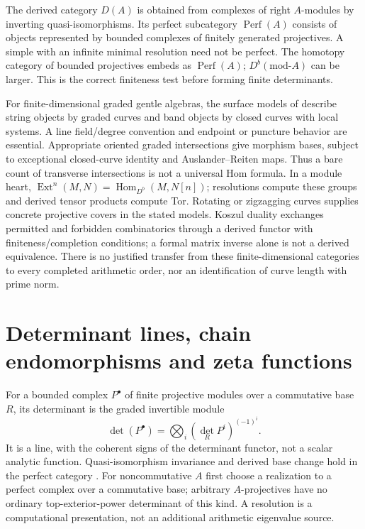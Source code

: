 The derived category $D(A)$ is obtained from complexes of right $A$-modules by inverting quasi-isomorphisms. Its perfect subcategory $\operatorname{Perf}(A)$ consists of objects represented by bounded complexes of finitely generated projectives. A simple with an infinite minimal resolution need not be perfect. The homotopy category of bounded projectives embeds as $\operatorname{Perf}(A)$; $D^b(\mathrm{mod}\text{-}A)$ can be larger. This is the correct finiteness test before forming finite determinants.

For finite-dimensional graded gentle algebras, the surface models of \cite{OPS,Chang,LZZ,Koszul} describe string objects by graded curves and band objects by closed curves with local systems. A line field/degree convention and endpoint or puncture behavior are essential. Appropriate oriented graded intersections give morphism bases, subject to exceptional closed-curve identity and Auslander--Reiten maps. Thus a bare count of transverse intersections is not a universal Hom formula. In a module heart, $\operatorname{Ext}^n(M,N)=\operatorname{Hom}_{D^b}(M,N[n])$; resolutions compute these groups and derived tensor products compute Tor. Rotating or zigzagging curves supplies concrete projective covers in the stated models. Koszul duality exchanges permitted and forbidden combinatorics through a derived functor with finiteness/completion conditions; a formal matrix inverse alone is not a derived equivalence. There is no justified transfer from these finite-dimensional categories to every completed arithmetic order, nor an identification of curve length with prime norm.

\section{Determinant lines, chain endomorphisms and zeta functions}
For a bounded complex $P^\bullet$ of finite projective modules over a commutative base $R$, its determinant is the graded invertible module
\[
 \det(P^\bullet)=\bigotimes_i(\det_R P^i)^{(-1)^i}.
\]
It is a line, with the coherent signs of the determinant functor, not a scalar analytic function. Quasi-isomorphism invariance and derived base change hold in the perfect category \cite{KM,Breuning,DetRecent}. For noncommutative $A$ first choose a realization to a perfect complex over a commutative base; arbitrary $A$-projectives have no ordinary top-exterior-power determinant of this kind. A resolution is a computational presentation, not an additional arithmetic eigenvalue source.

